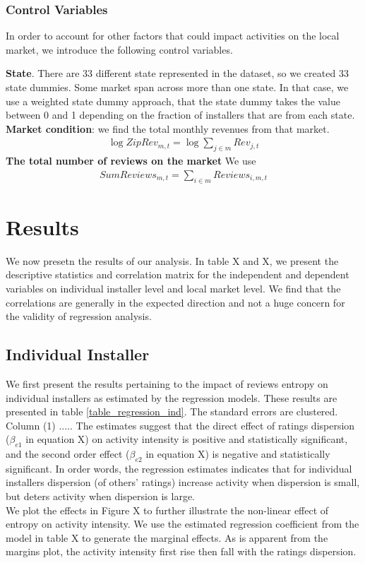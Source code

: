 \documentclass[msom,blindrev]{informs3}
\begin{document}
\subsubsection{Control Variables}
In order to account for other factors that could impact activities on the local market, we introduce the following control variables. 

 \textbf{State}. There are 33 different state represented in the dataset, so we created 33 state dummies. Some market span across more than one state. In that case, we use a weighted state dummy approach, that the state dummy takes the value between 0 and 1 depending on the fraction of installers that are from each state. \\
  \textbf{Market condition}: 
we find the total monthly revenues from that market. 
\begin{align*}
\log ZipRev_{m,t}=\log \sum_{j\in m}Rev_{j,t}
\end{align*}
 \textbf{The total number of reviews on the market } We use 
\begin{align*}
SumReviews_{m,t}=\sum_{i\in m} Reviews_{i,m,t}
\end{align*}


\section{Results}
We now presetn the results of our analysis. In table X and X, we present the descriptive statistics and correlation matrix for the independent and dependent variables on individual installer level and local market level. We find that the correlations are generally in the expected direction and not a huge concern for the validity of regression analysis. 

\subsection{Individual Installer}
We first present the results pertaining to the impact of reviews entropy on individual installers as estimated by the regression models. These results are presented in table \ref{table_regression_ind}.  The standard errors are clustered. Column (1) ..... The estimates suggest that the direct effect of ratings dispersion ($\beta_{e1}$ in equation X) on activity intensity is positive and statistically significant, and the second order effect ($\beta_{e2}$ in equation X) is negative and statistically significant. In order words, the regression estimates indicates that for individual installers dispersion (of others' ratings) increase activity when dispersion is small, but deters activity when dispersion is large.\\
We plot the effects in Figure X to further illustrate the non-linear effect of entropy on activity intensity. We use the estimated regression coefficient from the model in table X to generate the marginal effects. As is apparent from the margins plot, the activity intensity first rise then fall with the ratings dispersion. 
\end{document}
